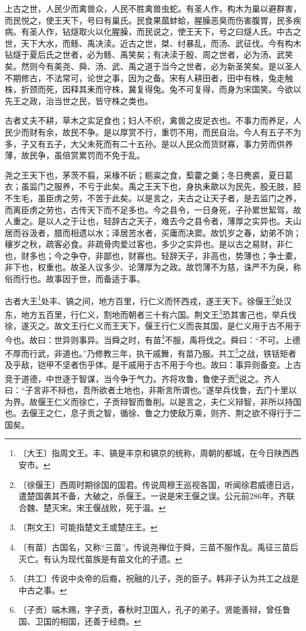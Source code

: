 \documentclass[12pt,UTF-8,openany,a4]{ctexbook}
\begin{document}
\begin{large}
    
    上古之世，人民少而禽兽众，人民不胜禽兽虫蛇。有圣人作，构木为巢以避群害，而民悦之，使王天下，号曰有巢氏。民食果蓏蚌蛤，腥臊恶臭而伤害腹胃，民多疾病。有圣人作，钻燧取火以化腥臊，而民说之，使王天下，号之曰燧人氏。中古之世，天下大水，而鲧、禹决渎。近古之世，桀、纣暴乱，而汤、武征伐。今有构木钻燧于夏后氏之世者，必为鲧、禹笑矣；有决渎于殷、周之世者，必为汤、武笑矣。然则今有美尧、舜、汤、武、禹之道于当今之世者，必为新圣笑矣。是以圣人不期修古，不法常可，论世之事，因为之备。宋有人耕田者，田中有株，兔走触株，折颈而死，因释其耒而守株，冀复得兔。兔不可复得，而身为宋国笑。今欲以先王之政，治当世之民，皆守株之类也。
    
    古者丈夫不耕，草木之实足食也；妇人不织，禽兽之皮足衣也。不事力而养足，人民少而财有余，故民不争。是以厚赏不行，重罚不用，而民自治。今人有五子不为多，子又有五子，大父未死而有二十五孙。是以人民众而货财寡，事力劳而供养薄，故民争，虽倍赏累罚而不免于乱。
    
    尧之王天下也，茅茨不翦，采椽不斫；粝粢之食，䔧藿之羹；冬日麂裘，夏日葛衣；虽监门之服养，不亏于此矣。禹之王天下也，身执耒歃以为民先，股无肢，胫不生毛，虽臣虏之劳，不苦于此矣。以是言之，夫古之让天子者，是去监门之养，而离臣虏之劳也，古传天下而不足多也。今之县令，一日身死，子孙累世絜驾，故人重之。是以人之于让也，轻辞古之天子，难去今之县令者，薄厚之实异也。夫山居而谷汲者，腊而相遗以水；泽居苦水者，买庸而决窦。故饥岁之春，幼弟不饷；穰岁之秋，疏客必食。非疏骨肉爱过客也，多少之实异也。是以古之易财，非仁也，财多也；今之争夺，非鄙也，财寡也。轻辞天子，非高也，势薄也；争士橐，非下也，权重也。故圣人议多少、论薄厚为之政。故罚薄不为慈，诛严不为戾，称俗而行也。故事因于世，而备适于事。
    
    古者大王\footnote{〔大王〕\yiwen 指周文王。丰、镐是丰京和镐京的统称，周朝的都城，在今日陕西西安市。}处丰、镐之间，地方百里，行仁义而怀西戎，遂王天下。徐偃王\footnote{〔徐偃王〕\yiwen 西周时期徐国的国君。传说周穆王巡视各国，听闻徐君威德日远，遣楚国袭其不备，大破之，杀偃王。一说是宋王偃之误。公元前286年，齐联合魏、楚灭宋。宋王偃战败，死于温。}处汉东，地方五百里，行仁义，割地而朝者三十有六国。荆文王\footnote{〔荆文王〕\yiwen 可能指楚文王或楚庄王。}恐其害己也，举兵伐徐，遂灭之。故文王行仁义而王天下，偃王行仁义而丧其国，是仁义用于古不用于今也。故曰：世异则事异。当舜之时，有苗\footnote{〔有苗〕\yiwen 古国名，又称“三苗”。传说尧禅位于舜，三苗不服作乱。禹征三苗后灭亡。有认为现代苗族是有苗文化的孑遗。}不服，禹将伐之。舜曰：“不可。上德不厚而行武，非道也。”乃修教三年，执干戚舞，有苗乃服。共工\footnote{〔共工〕\yiwen 传说中炎帝的后裔，祝融的儿子，尧的臣子。韩非子认为共工之战是中古之事。}之战，铁铦矩者及乎敌，铠甲不坚者伤乎体。是干戚用于古不用于今也。故曰：事异则备变。上古竞于道德，中世逐于智谋，当今争于气力。齐将攻鲁，鲁使子贡\footnote{〔子贡〕\yiwen 端木赐，字子贡，春秋时卫国人，孔子的弟子。贤能善辩，曾任鲁国、卫国的相国，还善于经商。}说之。齐人曰：“子言非不辩也，吾所欲者土地也，非斯言所谓也。”遂举兵伐鲁，去门十里以为界。故偃王仁义而徐亡，子贡辩智而鲁削。以是言之，夫仁义辩智，非所以持国也。去偃王之仁，息子贡之智，循徐、鲁之力使敌万乘，则齐、荆之欲不得行于二国矣。
    

\end{large}
\end{document}
